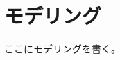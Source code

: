 \documentclass[fleqn]{jreport}
\begin{document}
    \chapter{モデリング}
        ここにモデリングを書く。
\end{document}

